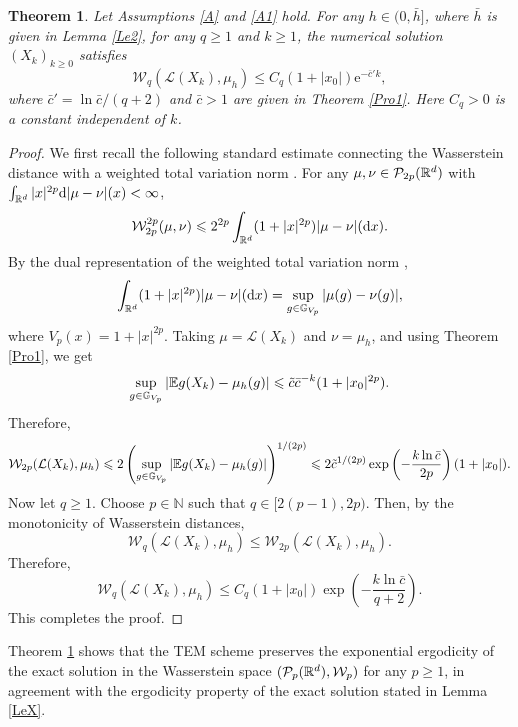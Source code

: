 \documentclass[aap]{imsart}
\theoremstyle{plain}
\newtheorem{theorem}{Theorem}[section]
\theoremstyle{definition}
\begin{document}
\begin{theorem}\label{Co}
	Let Assumptions \ref{A} and \ref{A1} hold. For any \(h\in(0,\bar h]\), where \(\bar h\) is given in Lemma \ref{Le2}, for any \(q\geqslant1\) and \(k\geqslant1\), the numerical solution \((X_k)_{k\geqslant0}\) satisfies
	\begin{equation*}
		\mathcal{W}_q(\mathcal{L}(X_k), \mu_h)\leqslant C_q (1+|x_0|)\mathrm{e}^{-\bar{c}'k},
	\end{equation*}
	where  $\bar{c}' = \ln \bar{c}/(q+2)$ and $\bar{c}>1$ are given in Theorem \ref{Pro1}. Here \(C_q>0\) is a constant independent of \(k\).
\end{theorem}
\begin{proof}
	We first recall the following standard estimate connecting the Wasserstein distance with a weighted total variation norm \cite[Theorem 6.15]{CV}. For any
	\(\mu,\nu\in\mathcal{P}_{2p}(\mathbb{R}^d)\) with $\int_{\mathbb{R}^d}|x|^{2p}\mathrm{d} |\mu-\nu|(x)<\infty$,
	\[\mathcal{W}_{2p}^{2p}(\mu,\nu)
	\leqslant 2^{2p}\int_{\mathbb{R}^d}(1+|x|^{2p})|\mu-\nu|(\mathrm{d} x).\]
	By the dual representation of the weighted total variation norm \cite[p.110-111]{Hairer},
	\[
	\int_{\mathbb{R}^d}(1+|x|^{2p})|\mu-\nu|(\mathrm{d} x)
	=
	\sup_{g\in\mathbb{G}_{V_p}}
	|\mu(g)-\nu(g)|,
	\]
	where \(V_p(x)=1+|x|^{2p}\).	
	Taking \(\mu=\mathcal{L}(X_k)\) and \(\nu=\mu_h\), and using Theorem \ref{Pro1}, we get
	\[
	\sup_{g\in\mathbb{G}_{V_p}}
	|\mathbb{E} g(X_k)-\mu_h(g)|
	\leqslant
	\tilde c \bar c^{-k}(1+|x_0|^{2p}).
	\]
	Therefore,
	\[\mathcal{W}_{2p}(\mathcal{L}(X_k),\mu_h)
		\leqslant
		2\left(
		\sup_{g\in\mathbb{G}_{V_p}}
		|\mathbb{E} g(X_k)-\mu_h(g)|
		\right)^{1/(2p)}  \leqslant
		2\tilde c^{1/(2p)}
		\exp\left(-\frac{k\ln\bar c}{2p}\right)
		(1+|x_0|).\]	
	Now let \(q\geqslant1\). Choose \(p\in\mathbb{N}\) such that \(q\in[2(p-1),2p)\).
	Then, by the monotonicity of Wasserstein distances,
	\[
	\mathcal{W}_q(\mathcal{L}(X_k),\mu_h)
	\leqslant
	\mathcal{W}_{2p}(\mathcal{L}(X_k),\mu_h).
	\]
	Therefore,
	\[
	\mathcal{W}_q(\mathcal{L}(X_k),\mu_h)
	\leqslant
	C_q(1+|x_0|)
	\exp\left(-\frac{k\ln\bar c}{q+2}\right).
	\]
	This completes the proof.
\end{proof}

Theorem \ref{Co} shows that the TEM scheme preserves the exponential ergodicity of the exact solution in the Wasserstein space
\((\mathcal{P}_p(\mathbb{R}^d),\mathcal{W}_p)\) for any \(p\geqslant1\), in agreement with the ergodicity property of the exact solution stated in Lemma \ref{LeX}.
	
	
\end{document}
